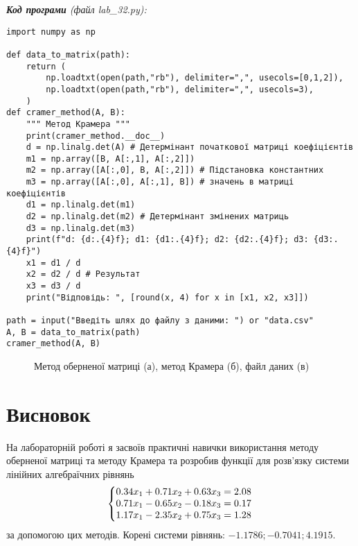 \documentclass{article}
\newcommand\lab{3}
\begin{document}
\begin{large}
\noindent\textit{\textbf{Код програми} (файл lab\_\lab2.py):}
\begin{lstlisting}
import numpy as np

def data_to_matrix(path):
	return (
		np.loadtxt(open(path,"rb"), delimiter=",", usecols=[0,1,2]),
		np.loadtxt(open(path,"rb"), delimiter=",", usecols=3),
	)
def cramer_method(A, B):
	""" Метод Крамера """
	print(cramer_method.__doc__)
	d = np.linalg.det(A) # Детермінант початкової матриці коефіцієнтів
	m1 = np.array([B, A[:,1], A[:,2]])
	m2 = np.array([A[:,0], B, A[:,2]]) # Підстановка константних
	m3 = np.array([A[:,0], A[:,1], B]) # значень в матриці коефіцієнтів
	d1 = np.linalg.det(m1)
	d2 = np.linalg.det(m2) # Детермінант змінених матриць
	d3 = np.linalg.det(m3)
	print(f"d: {d:.{4}f}; d1: {d1:.{4}f}; d2: {d2:.{4}f}; d3: {d3:.{4}f}")
	x1 = d1 / d
	x2 = d2 / d # Результат
	x3 = d3 / d
	print("Відповідь: ", [round(x, 4) for x in [x1, x2, x3]])

path = input("Введіть шлях до файлу з даними: ") or "data.csv"
A, B = data_to_matrix(path)
cramer_method(A, B)\end{lstlisting}

		\begin{figure}[h!]
			\centering
			\subfigure[]{\texttt{[image: 2]}}
			\subfigure[]{\texttt{[image: 1]}}
			\subfigure[]{\texttt{[image: 3]}}
			\caption{Метод оберненої матриці (а), метод Крамера (б), файл даних (в)}
		\end{figure}
		
		\section*{Висновок}
		На лабораторній роботі я засвоїв практичні навички використання методу оберненої матриці та методу Крамера та розробив функції для розв’язку системи лінійних алгебраїчних рівнянь 
		\begin{gather}\nonumber
			\left\{\begin{array}{@{}l@{}}
				0.34x_1 + 0.71x_2 + 0.63x_3 = 2.08\\\nonumber
				0.71x_1 - 0.65x_2 - 0.18x_3 = 0.17\\\nonumber
				1.17x_1 - 2.35x_2 + 0.75x_3 = 1.28\nonumber
			\end{array}\right.\,
		\end{gather}
		 за допомогою цих методів. Корені системи рівнянь: $-1.1786; -0.7041; 4.1915$.

	\end{large}
\end{document}
